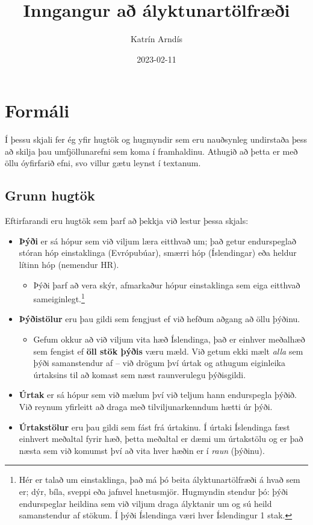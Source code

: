 \documentclass[
]{book}
\title{Inngangur að ályktunartölfræði}
\author{Katrín Arndís}
\date{2023-02-11}
\providecommand{\tightlist}{%
  \setlength{\itemsep}{0pt}\setlength{\parskip}{0pt}}
\begin{document}
\maketitle

{
\setcounter{tocdepth}{1}
\tableofcontents
}
\hypertarget{formuxe1li}{%
\chapter{Formáli}\label{formuxe1li}}

Í þessu skjali fer ég yfir hugtök og hugmyndir sem eru nauðsynleg
undirstaða þess að skilja þau umfjöllunarefni sem koma í framhaldinu.
Athugið að þetta er með öllu óyfirfarið efni, svo villur gætu leynst í
textanum.

\hypertarget{grunn-hugtuxf6k}{%
\section{Grunn hugtök}\label{grunn-hugtuxf6k}}

Eftirfarandi eru hugtök sem þarf að þekkja við lestur þessa skjals:

\begin{itemize}
\tightlist
\item
  \textbf{Þýði} er sá hópur sem við viljum læra eitthvað um; það getur
  endurspeglað stóran hóp einstaklinga (Evrópubúar), smærri hóp
  (Íslendingar) eða heldur lítinn hóp (nemendur HR).

  \begin{itemize}
  \tightlist
  \item
    Þýði þarf að vera skýr, afmarkaður hópur einstaklinga sem eiga
    eitthvað sameiginlegt.\footnote{Hér er talað um einstaklinga, það má þó beita
      ályktunartölfræði á hvað sem er; dýr, bíla, sveppi eða jafnvel
      hnetusmjör. Hugmyndin stendur þó: þýði endurspeglar heildina sem við
      viljum draga ályktanir um og sú heild samanstendur af stökum. Í þýði
      Íslendinga væri hver Íslendingur 1 stak.}
  \end{itemize}
\item
  \textbf{Þýðistölur} eru þau gildi sem fengjust ef við hefðum aðgang að
  öllu þýðinu.

  \begin{itemize}
  \tightlist
  \item
    Gefum okkur að við viljum vita hæð Íslendinga, það er einhver
    meðalhæð sem fengist ef \textbf{öll stök þýðis} væru mæld. Við getum
    ekki mælt \emph{alla} sem þýði samanstendur af -- við drögum því
    úrtak og athugum eiginleika úrtaksins til að komast sem næst
    raunverulegu þýðisgildi.
  \end{itemize}
\item
  \textbf{Úrtak} er sá hópur sem við mælum því við teljum hann endurspegla
  þýðið. Við reynum yfirleitt að draga með tilviljunarkenndum hætti úr
  þýði.
\item
  \textbf{Úrtakstölur} eru þau gildi sem fást frá úrtakinu. Í úrtaki
  Íslendinga fæst einhvert meðaltal fyrir hæð, þetta meðaltal er dæmi
  um úrtakstölu og er það næsta sem við komumst því að vita hver hæðin
  er í \emph{raun} (þýðinu).
\end{itemize}
\end{document}
